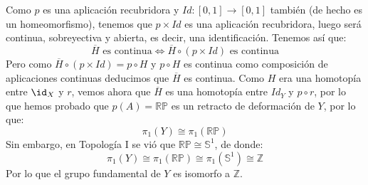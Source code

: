 \documentclass[12pt]{article}
\begin{document}
\begin{ejercicio}
\begin{enumerate}[label=\alph*)]
                    \noindent
                    Como $p$ es una aplicación recubridora y $Id:[0,1]\to [0,1]$ también (de hecho es un homeomorfismo), tenemos que $p\times Id$ es una aplicación recubridora, luego será continua, sobreyectiva y abierta, es decir, una identificación. Tenemos así que:
                    \begin{equation*}
                        \overline{H} \text{\ es continua} \Longleftrightarrow \overline{H}\circ (p\times Id) \text{\ es continua}
                    \end{equation*}
                    Pero como $\overline{H}\circ (p\times Id) = p\circ H$ y $p\circ H$ es continua como composición de aplicaciones continuas deducimos que $\overline{H}$ es continua. Como $H$ era una homotopía entre $\id_X$ y $r$, vemos ahora que $\overline{H}$ es una homotopía entre $Id_Y$ y $p\circ r$, por lo que hemos probado que $p(A) = \mathbb{R}\mathbb{P}$ es un retracto de deformación de $Y$, por lo que:
                    \begin{equation*}
                        \pi_1(Y) \cong \pi_1(\mathbb{R}\mathbb{P})
                    \end{equation*}
                    Sin embargo, en Topología I se vió que $\mathbb{R}\mathbb{P}\cong \mathbb{S}^1$, de donde:
                    \begin{equation*}
                        \pi_1(Y) \cong \pi_1(\mathbb{R}\mathbb{P}) \cong \pi_1(\mathbb{S}^1) \cong \mathbb{Z}
                    \end{equation*}
                    Por lo que el grupo fundamental de $Y$ es isomorfo a $\mathbb{Z}$.
        \end{enumerate}
    \end{ejercicio}
\end{document}
